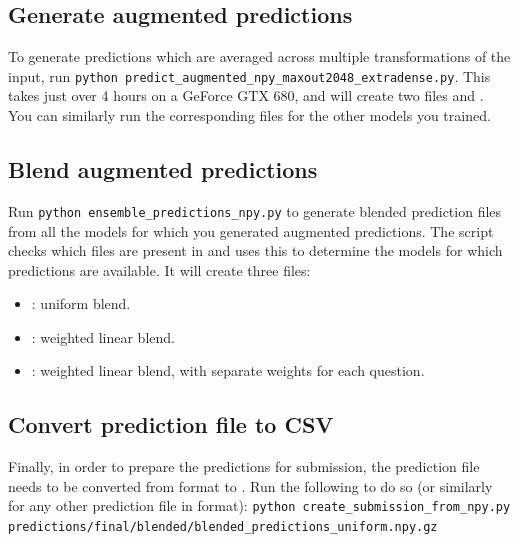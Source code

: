 \documentclass[a4paper,10pt]{article}
\begin{document}
\subsection{Generate augmented predictions}

To generate predictions which are averaged across multiple transformations of the input, run \texttt{python predict\_augmented\_npy\_maxout2048\_extradense.py}. This takes just over 4 hours on a GeForce GTX 680, and will create two files  and  . You can similarly run the corresponding  files for the other models you trained. 

\subsection{Blend augmented predictions}

Run \texttt{python ensemble\_predictions\_npy.py} to generate blended prediction files from all the models for which you generated augmented predictions. The script checks which files are present in  and uses this to determine the models for which predictions are available. It will create three files:
\begin{itemize}
 \item {}: uniform blend.
 \item {}: weighted linear blend.
 \item {}: weighted linear blend, with separate weights for each question.
\end{itemize}

\subsection{Convert prediction file to CSV}

Finally, in order to prepare the predictions for submission, the prediction file needs to be converted from  format to . Run the following to do so (or similarly for any other prediction file in  format): \texttt{python create\_submission\_from\_npy.py} \\ \texttt{predictions/final/blended/blended\_predictions\_uniform.npy.gz}
\end{document}
